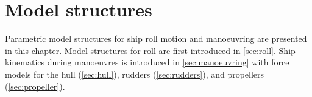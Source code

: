 \chapter{Model structures}
\label{ch:models}
\noindent Parametric model structures for ship roll motion and manoeuvring are presented in this chapter. Model structures for roll are first introduced in \autoref{sec:roll}. 
Ship kinematics during manoeuvres is introduced in \autoref{sec:manoeuvring} with force models for the hull (\autoref{sec:hull}), rudders (\autoref{sec:rudders}), and propellers (\autoref{sec:propeller}).






%
%
%